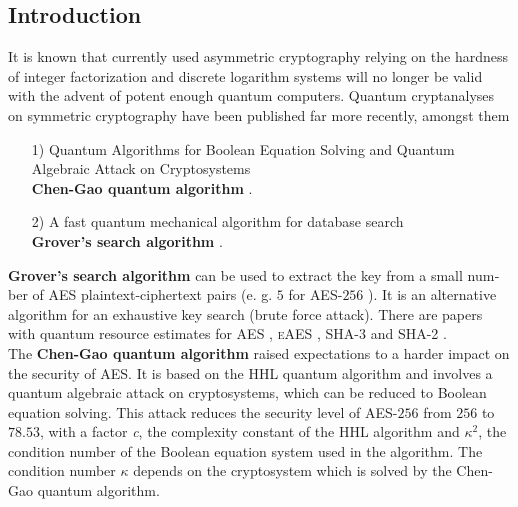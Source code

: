 \documentclass[a4paper,11pt]{article}
\begin{document}
\begin{otherlanguage}{english}
\section{Introduction}

\noindent
It is known that currently used asymmetric cryptography relying on the hardness of integer factorization and discrete logarithm systems will no longer be valid with the advent of potent enough quantum computers. Quantum cryptanalyses on symmetric cryptography have been published far more recently, amongst them \\

\begin{itemize} [noitemsep, nolistsep]
  \item[1)] Quantum Algorithms for Boolean Equation Solving and Quantum Algebraic Attack on Cryptosystems \\
  \textbf{Chen-Gao quantum algorithm} \cite{QAA}.
  \vspace{0.1cm}
  \item[2)] A fast quantum mechanical algorithm for database search \\
  \textbf{Grover’s search algorithm} \cite{GRV}.
  \vspace{0.1cm}
\end{itemize}
\vspace{0.5cm}

\noindent
\textbf{Grover’s search algorithm} can be used to extract the key from a small number of \textsc{AES} plaintext-ciphertext pairs (e. g. $5$ for \textsc{AES}-$256$ \cite{GRO}). It is an alternative algorithm for an exhaustive key search (brute force attack). There are papers with quantum resource estimates for \textsc{AES} \cite{GRO}, \textsc{eAES} \cite{KUN, CEX}, \textsc{SHA-3} \cite{QSH} and \textsc{SHA-2} \cite{QSH}. \\

\noindent
The \textbf{Chen-Gao quantum algorithm} raised expectations to a harder impact on the security of \textsc{AES}. It is based on the \textsc{HHL} quantum algorithm \cite{HHL} and involves a quantum algebraic attack on cryptosystems, which can be reduced to Boolean equation solving. This attack reduces the security level of \textsc{AES}-$256$ from $256$ to $78.53$, with a factor \textit{c}, the complexity constant of the \textsc{HHL} algorithm and $\kappa^2$, the condition number of the Boolean equation system used in the algorithm. The condition number $\kappa$ depends on the cryptosystem which is solved by the Chen-Gao quantum algorithm. \\


\end{otherlanguage}
\end{document}

